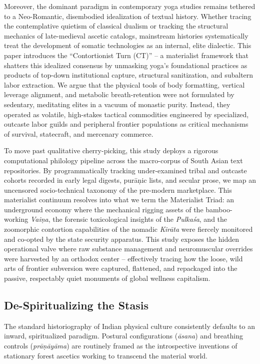 \documentclass[11pt,twoside,letterpaper]{article}
\begin{document}
Moreover, the dominant paradigm in contemporary yoga studies remains tethered to a Neo-Romantic, disembodied idealization of textual history. Whether tracing the contemplative quietism of classical dualism or tracking the structural mechanics of late-medieval ascetic catalogs, mainstream histories systematically treat the development of somatic technologies as an internal, elite dialectic. This paper introduces the ``Contortionist Turn (CT)'' -- a materialist framework that shatters this idealized consensus by unmasking yoga's foundational practices as products of top-down institutional capture, structural sanitization, and subaltern labor extraction. We argue that the physical tools of body formatting, vertical leverage alignment, and metabolic breath-retention were not formulated by sedentary, meditating elites in a vacuum of monastic purity. Instead, they operated as volatile, high-stakes tactical commodities engineered by specialized, outcaste labor guilds and peripheral frontier populations as critical mechanisms of survival, statecraft, and mercenary commerce.

To move past qualitative cherry-picking, this study deploys a rigorous computational philology pipeline across the macro-corpus of South Asian text repositories. By programmatically tracking under-examined tribal and outcaste cohorts recorded in early legal digests, purāṇic lists, and secular prose, we map an uncensored socio-technical taxonomy of the pre-modern marketplace. This materialist continuum resolves into what we term the Materialist Triad: an underground economy where the mechanical rigging assets of the bamboo-working \textit{Vaiṇa}, the forensic toxicological insights of the \textit{Pulkaśa}, and the zoomorphic contortion capabilities of the nomadic \textit{Kirāta} were fiercely monitored and co-opted by the state security apparatus. This study exposes the hidden operational valve where raw substance management and neuromuscular overrides were harvested by an orthodox center -- effectively tracing how the loose, wild arts of frontier subversion were captured, flattened, and repackaged into the passive, respectably quiet monuments of global wellness capitalism.

\subsection{De-Spiritualizing the Stasis}
The standard historiography of Indian physical culture consistently defaults to an inward, spiritualized paradigm. Postural configurations (\textit{āsana}) and breathing controls (\textit{prāṇāyāma}) are routinely framed as the introspective inventions of stationary forest ascetics working to transcend the material world.
\end{document}
